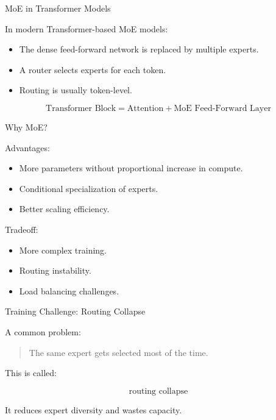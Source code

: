 \documentclass[aspectratio=169]{beamer}
\begin{document}
\begin{frame}{MoE in Transformer Models}

In modern Transformer-based MoE models:

\begin{itemize}
    \item The dense feed-forward network is replaced by multiple experts.
    \item A router selects experts for each token.
    \item Routing is usually token-level.
\end{itemize}

\vspace{0.4cm}

\[
\text{Transformer Block}
=
\text{Attention}
+
\text{MoE Feed-Forward Layer}
\]

\end{frame}

\begin{frame}{Why MoE?}

Advantages:

\begin{itemize}
    \item More parameters without proportional increase in compute.
    \item Conditional specialization of experts.
    \item Better scaling efficiency.
\end{itemize}

\vspace{0.4cm}

Tradeoff:

\begin{itemize}
    \item More complex training.
    \item Routing instability.
    \item Load balancing challenges.
\end{itemize}

\end{frame}

\begin{frame}{Training Challenge: Routing Collapse}

A common problem:

\begin{quote}
The same expert gets selected most of the time.
\end{quote}

\vspace{0.4cm}

This is called:

\[
\text{routing collapse}
\]

\vspace{0.4cm}

It reduces expert diversity and wastes capacity.

\end{frame}
\end{document}
